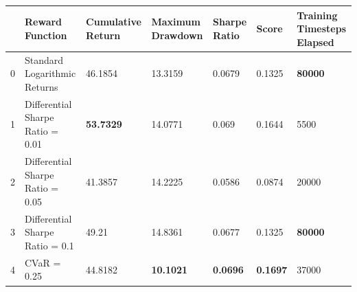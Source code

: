 \begin{tabular}{lllllll}
\toprule
 & Reward Function & Cumulative Return & Maximum Drawdown & Sharpe Ratio & Score & Training Timesteps Elapsed \\
\midrule
0 & Standard Logarithmic Returns & 46.1854 & 13.3159 & 0.0679 & 0.1325 & \textbf{80000} \\
1 & Differential Sharpe Ratio = 0.01 & \textbf{53.7329} & 14.0771 & 0.069 & 0.1644 & 5500 \\
2 & Differential Sharpe Ratio = 0.05 & 41.3857 & 14.2225 & 0.0586 & 0.0874 & 20000 \\
3 & Differential Sharpe Ratio = 0.1 & 49.21 & 14.8361 & 0.0677 & 0.1325 & \textbf{80000} \\
4 & CVaR = 0.25 & 44.8182 & \textbf{10.1021} & \textbf{0.0696} & \textbf{0.1697} & 37000 \\
\bottomrule
\end{tabular}
